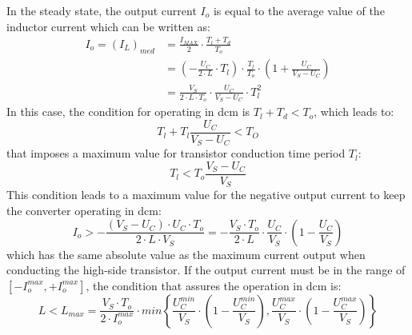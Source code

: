 In the steady state, the output current $I_o$ is equal to the average value of the inductor current which can be written as:
\begin{equation}
    \begin{split}
        I_o = (I_L)_{med} &= \frac{I_{MAX}}{2} \cdot \frac{T_l + T_d}{T_o} \\
        &= \left(-\frac{U_C}{2 \cdot L} \cdot T_l\right) \cdot \frac{T_l}{T_o} \cdot \left(1 + \frac{U_C}{V_S - U_C}\right) \\
        &= \frac{V_S}{2 \cdot L \cdot T_o} \cdot \frac{U_C}{V_S - U_C} \cdot T_l^2
    \end{split}
\end{equation}
In this case, the condition for operating in \gls{dcm} is $T_l + T_d < T_o$, which leads to:
\begin{equation}
    T_l + T_l \frac{U_C}{V_S - U_C} < T_O
\end{equation}
that imposes a maximum value for transistor conduction time period $T_l$:
\begin{equation}
    T_l < T_o \frac{V_S - U_C}{V_S}
\end{equation}
This condition leads to a maximum value for the negative output current to keep the converter operating in \gls{dcm}:
\begin{equation}
    I_o > -\frac{(V_S - U_C) \cdot U_C \cdot T_o}{2 \cdot L \cdot V_S} = -\frac{V_S \cdot T_o}{2 \cdot L} \cdot \frac{U_C}{V_S} \cdot \left(1 - \frac{U_C}{V_S}\right) 
\end{equation}
which has the same absolute value as the maximum current output when conducting the high-side transistor.
If the output current must be in the range of $[-I_o^{max}, +I_o^{max}]$, the condition that assures the operation in \gls{dcm} is:
\begin{equation}
    L < L_{max} = \frac{V_S \cdot T_o}{2 \cdot I_o^{max}} \cdot min\left\{\frac{U_C^{min}}{V_S} \cdot \left(1 - \frac{U_C^{min}}{V_S}\right), \frac{U_C^{max}}{V_S} \cdot \left(1 - \frac{U_C^{max}}{V_S}\right)\right\}
\end{equation}